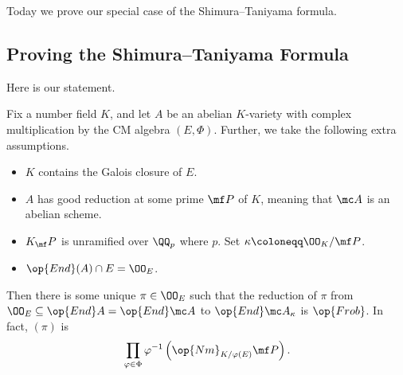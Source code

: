 \documentclass[../notes.tex]{subfiles}
\begin{document}
Today we prove our special case of the Shimura--Taniyama formula.

\subsection{Proving the Shimura--Taniyama Formula}
Here is our statement.
\begin{theorem} \label{thm:st-proved}
	Fix a number field $K$, and let $A$ be an abelian $K$-variety with complex multiplication by the CM algebra $(E,\Phi)$. Further, we take the following extra assumptions.
	\begin{itemize}
		\item $K$ contains the Galois closure of $E$.
		\item $A$ has good reduction at some prime $\mf P$ of $K$, meaning that $\mc A$ is an abelian scheme.
		\item $K_\mf P$ is unramified over $\QQ_p$ where $p$. Set $\kappa\coloneqq\OO_K/\mf P$.
		\item $\op{End}(A)\cap E=\OO_E$.
	\end{itemize}
	Then there is some unique $\pi\in\OO_E$ such that the reduction of $\pi$ from $\OO_E\subseteq\op{End}A=\op{End}\mc A$ to $\op{End}\mc A_\kappa$ is $\op{Frob}$. In fact, $(\pi)$ is
	\[\prod_{\varphi\in\Phi}\varphi^{-1}\left(\op{Nm}_{K/\varphi(E)}\mf P\right).\]
\end{theorem}
\end{document}
